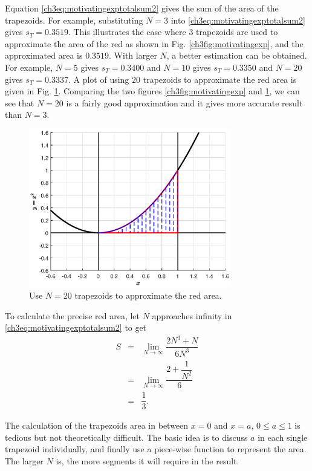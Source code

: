 Equation \eqref{ch3eq:motivatingexptotalsum2} gives the sum of the area of the trapezoids. For example, substituting $N=3$ into \eqref{ch3eq:motivatingexptotalsum2} gives $s_{T} = 0.3519$. This illustrates the case where 3 trapezoids are used to approximate the area of the red as shown in Fig. \ref{ch3fig:motivatingexp}, and the approximated area is $0.3519$. With larger $N$, a better estimation can be obtained. For example, $N=5$ gives $s_{T} = 0.3400$ and $N=10$ gives $s_{T} = 0.3350$ and $N=20$ gives $s_{T} = 0.3337$. A plot of using $20$ trapezoids to approximate the red area is given in Fig. \ref{ch3fig:motivatingexpN20}. Comparing the two figures \ref{ch3fig:motivatingexp} and \ref{ch3fig:motivatingexpN20}, we can see that $N=20$ is a fairly good approximation and it gives more accurate result than $N=3$.
\begin{figure}
\centering
\includegraphics[width=250pt]{chapters/chapter3/figures/motivatingexpN20.eps}
\caption{Use $N=20$ trapezoids to approximate the red area.} \label{ch3fig:motivatingexpN20}
\end{figure}

To calculate the precise red area, let $N$ approaches infinity in \eqref{ch3eq:motivatingexptotalsum2} to get
\begin{eqnarray}
    S &=& \lim_{N\rightarrow\infty}\dfrac{2N^3 + N}{6N^3} \nonumber \\
    &=& \lim_{N\rightarrow\infty}\dfrac{2 + \dfrac{1}{N^2}}{6} \nonumber \\
    &=& \dfrac{1}{3}. \nonumber
\end{eqnarray}

The calculation of the trapezoids area in between $x=0$ and $x=a$, $0 \leq a \leq 1$ is tedious but not theoretically difficult. The basic idea is to discuss $a$ in each single trapezoid individually, and finally use a piece-wise function to represent the area. The larger $N$ is, the more segments it will require in the result.

